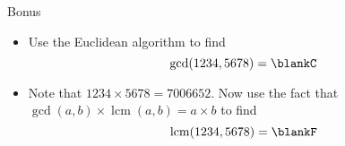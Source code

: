 \documentclass[12pt,letterpaper]{article}
\begin{document}
\begin{problem}{Bonus}
 \begin{itemize}
  \item Use the Euclidean algorithm to find \[
   \gcd(1234, 5678) = \blankC
  \]

  \item Note that $1234 \times 5678 = 7006652$. Now use the fact that
  $\gcd(a, b) \times \operatorname{lcm}(a, b) = a \times b$ to find \[
   \operatorname{lcm}(1234, 5678) = \blankF
  \]
 \end{itemize}
\end{problem}
\end{document}

